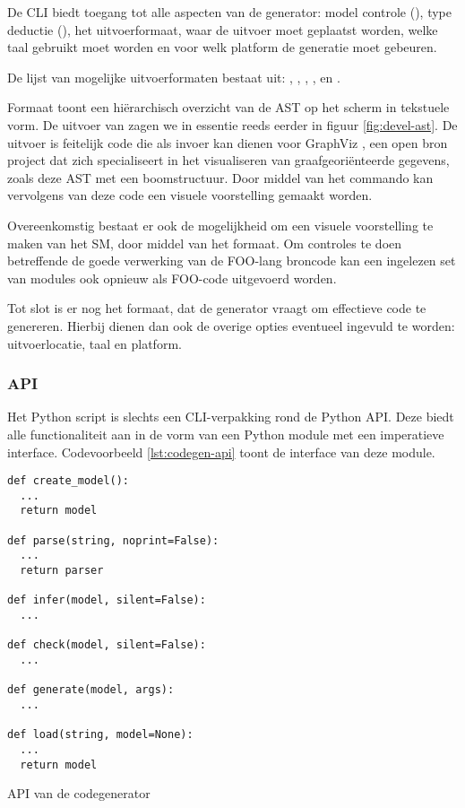 De CLI biedt toegang tot alle aspecten van de generator: model controle
(), type deductie (), het uitvoerformaat, waar de uitvoer
moet geplaatst worden, welke taal gebruikt moet worden en voor welk platform de
generatie moet gebeuren.

De lijst van mogelijke uitvoerformaten bestaat uit: , ,
, ,  en .

Formaat  toont een hi\"erarchisch overzicht van de AST op het scherm
in tekstuele vorm. De uitvoer van  zagen we in essentie reeds
eerder in figuur \ref{fig:devel-ast}. De uitvoer is feitelijk code die als
invoer kan dienen voor GraphViz \citep{url:graphviz}, een open bron project dat
zich specialiseert in het visualiseren van graafgeori\"enteerde gegevens, zoals
deze AST met een boomstructuur. Door middel van het  commando kan
vervolgens van deze code een visuele voorstelling gemaakt worden.

Overeenkomstig bestaat er ook de mogelijkheid om een visuele voorstelling te
maken van het SM, door middel van het  formaat. Om controles te
doen betreffende de goede verwerking van de FOO-lang broncode kan een ingelezen
set van modules ook opnieuw als FOO-code uitgevoerd worden.

Tot slot is er nog het  formaat, dat de generator vraagt om
effectieve code te genereren. Hierbij dienen dan ook de overige opties
eventueel ingevuld te worden: uitvoerlocatie, taal en platform.

\subsubsection{API}

Het  Python script is slechts een CLI-verpakking rond de Python
API. Deze biedt alle functionaliteit aan in de vorm van een Python module met
een imperatieve interface. Codevoorbeeld \ref{lst:codegen-api} toont de interface
van deze module.

\begin{listing}[ht]
  \begin{verbatim}
def create_model():
  ...
  return model

def parse(string, noprint=False):
  ...
  return parser

def infer(model, silent=False):
  ...

def check(model, silent=False):
  ...

def generate(model, args):
  ...

def load(string, model=None):
  ...
  return model
  \end{verbatim}
  \vspace{-5mm}
  \caption{API van de codegenerator}
  \label{lst:codegen-api}
\end{listing}

